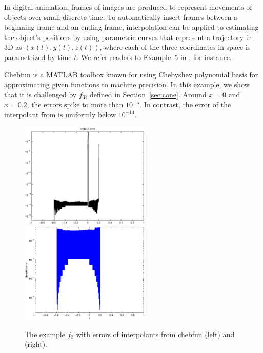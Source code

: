 In digital animation, frames of images are produced to represent movements of
objects over small discrete time. To automatically insert frames between a
beginning frame and an ending frame, interpolation can be applied to estimating
the object's positions by using parametric curves that represent a trajectory in
3D as $(x(t), y(t), z(t))$, where each of the three coordinates in space is
parametrized by time $t$.  We refer readers to Example~5 in \cite{Din15a}, for instance.



\begin{exmp}
Chebfun is a MATLAB toolbox known for using Chebyshev polynomial basis for
approximating given functions to machine precision. In this example, we show
that it is challenged by $f_3$, defined in Section~\ref{sec:cone}. Around $x=0$
and $x=0.2$, the errors spike to more than $10^{-5}$. In contrast, the error of
the interpolant from \funappxg is uniformly below $10^{-14}$.

\begin{figure}[t]
\centering
\includegraphics[width=6.2cm]{figure/chebfunf3.eps} \hspace{-5ex}
\includegraphics[width=6.2cm]{figure/funappxNoPenaltyf3.eps}
\caption{The example $f_3$ with errors of interpolants from chebfun (left) and \funappxg (right).}
\label{f3fig}
\end{figure}
\end{exmp}

